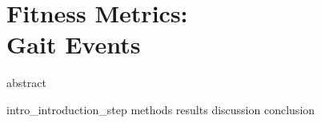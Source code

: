 \chapter{Fitness Metrics: \\ Gait Events}
\label{chapter:Step}
\glsresetall
{abstract}



\clearpage
{intro_introduction_step}
{methods}
{results}
{discussion}
{conclusion}

